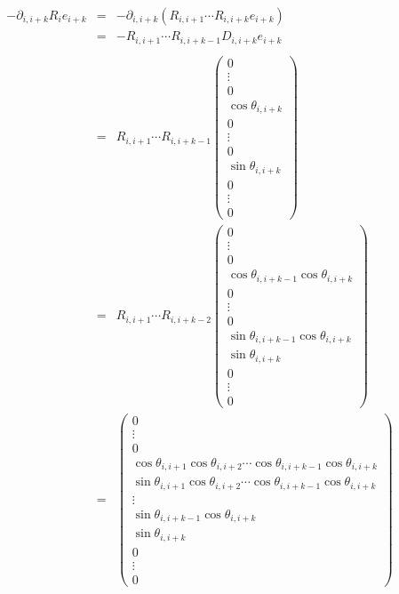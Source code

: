 \documentclass[ba]{imsart}
\numberwithin{equation}{section}
\theoremstyle{plain}
\begin{document}
\begin{eqnarray}
-\partial_{i,i+k} R_i e_{i+k} &=&   -\partial_{i,i+k} (R_{i,i+1} \cdots R_{i,i+k} e_{i+k}) \\
&=& -R_{i,i+1} \cdots R_{i,i+k-1} D_{i,i+k} e_{i+k} \\
\\
&=&
R_{i,i+1} \cdots R_{i,i+k-1}
\begin{pmatrix}
0\\
\vdots\\
0\\
\cos \theta_{i,i+k}\\
0\\
\vdots\\
0\\
\sin \theta_{i,i+k}\\
0\\
\vdots\\
0
\end{pmatrix}
\\
&=&
R_{i,i+1} \cdots R_{i,i+k-2}
\begin{pmatrix}
0\\
\vdots\\
0\\
\cos \theta_{i,i+k-1} \cos \theta_{i,i+k}\\
0\\
\vdots\\
0\\
\sin \theta_{i,i+k-1} \cos \theta_{i,i+k}\\
\sin \theta_{i,i+k}\\
0\\
\vdots\\
0
\end{pmatrix}
\\
&=&
\begin{pmatrix}
0\\
\vdots\\
0\\
\cos \theta_{i,i+1} \cos \theta_{i,i+2} \cdots \cos \theta_{i,i+k-1} \cos \theta_{i,i+k}\\
\sin \theta_{i,i+1} \cos \theta_{i,i+2} \cdots \cos \theta_{i,i+k-1} \cos \theta_{i,i+k}\\
\vdots\\
\sin \theta_{i,i+k-1} \cos \theta_{i,i+k}\\
\sin \theta_{i,i+k}\\
0\\
\vdots\\
0
\end{pmatrix}
\\
\end{eqnarray}
\end{document}

